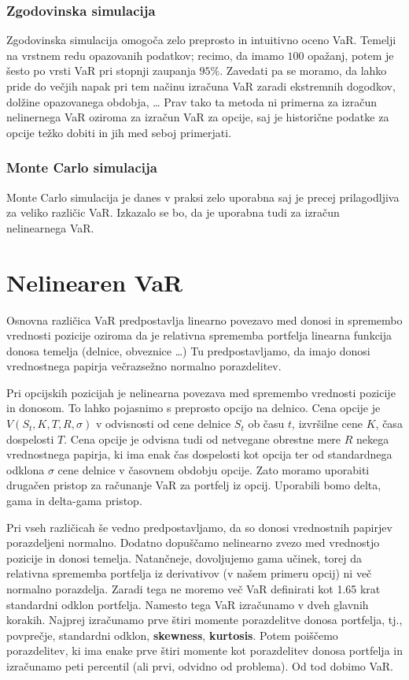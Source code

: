 \documentclass[12pt,a4paper]{amsart}
\theoremstyle{definition} %
\theoremstyle{definition}
\theoremstyle{definition}
\theoremstyle{definition}
\theoremstyle{plain} %
\begin{document}
\subsubsection{Zgodovinska simulacija}
Zgodovinska simulacija omogoča zelo preprosto in intuitivno oceno VaR. Temelji na vrstnem redu opazovanih podatkov;
recimo, da imamo $100$ opažanj, potem je šesto po vrsti VaR pri stopnji zaupanja $95\%$. 
Zavedati pa se moramo, da lahko pride do večjih napak pri tem načinu izračuna VaR zaradi ekstremnih dogodkov, dolžine opazovanega obdobja, \dots
Prav tako ta metoda ni primerna za izračun nelinernega VaR oziroma 
za izračun VaR za opcije, saj je historične podatke za opcije težko dobiti in jih med seboj primerjati.

\subsubsection{Monte Carlo simulacija}
Monte Carlo simulacija je danes v praksi zelo uporabna saj je precej prilagodljiva za veliko različic VaR. 
Izkazalo se bo, da je uporabna tudi za izračun nelinearnega VaR.

\section{Nelinearen VaR}

Osnovna različica VaR predpostavlja linearno povezavo med donosi in spremembo vrednosti pozicije
oziroma da je relativna sprememba portfelja linearna funkcija donosa temelja (delnice, obveznice \dots)
Tu predpostavljamo, da imajo donosi vrednostnega papirja večrazsežno normalno porazdelitev.  

Pri opcijskih pozicijah je nelinearna povezava med spremembo vrednosti pozicije in donosom. 
To lahko pojasnimo s preprosto opcijo na delnico. Cena opcije je $V(S_t,K,T,R,\sigma)$ v 
odvisnosti od cene delnice $S_t$ ob času $t$, izvršilne cene $K$, časa dospelosti $T$. 
Cena opcije je odvisna tudi od netvegane obrestne mere $R$ nekega vrednostnega papirja, ki ima enak
čas dospelosti kot opcija ter od standardnega odklona $\sigma$ cene delnice v časovnem obdobju opcije. 
Zato moramo uporabiti drugačen pristop za računanje VaR za portfelj iz opcij. 
Uporabili bomo delta, gama in delta-gama pristop.

Pri vseh različicah še vedno predpostavljamo, da so donosi vrednostnih papirjev porazdeljeni normalno. 
Dodatno dopuščamo nelinearno zvezo med vrednostjo pozicije in donosi temelja. Natančneje, dovoljujemo gama učinek,
torej da relativna sprememba portfelja iz derivativov (v našem primeru opcij) ni več normalno porazdelja. 
Zaradi tega ne moremo več VaR definirati kot 1.65 krat standardni odklon portfelja. Namesto tega VaR 
izračunamo v dveh glavnih korakih. Najprej izračunamo prve štiri momente porazdelitve donosa portfelja, tj.,
povprečje, standardni odklon, \textbf{skewness}, \textbf{kurtosis}. Potem poiščemo 
porazdelitev, ki ima enake prve štiri momente kot porazdelitev donosa portfelja in izračunamo peti 
percentil (ali prvi, odvidno od problema). Od tod dobimo VaR.
\end{document}
